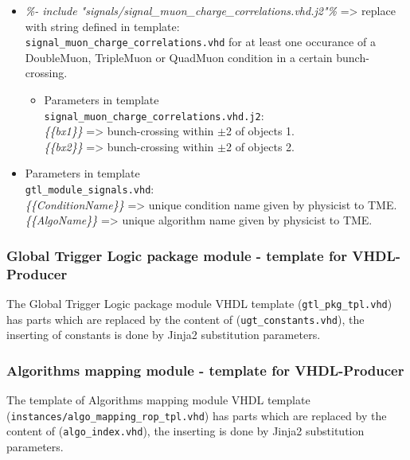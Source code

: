 \begin{itemize}
\item \textit{{\%- include "signals/signal\_muon\_charge\_correlations.vhd.j2"\%}} => replace with string defined in template:\\
\texttt{signal\_muon\_charge\_correlations.vhd} for at least one occurance of a DoubleMuon, TripleMuon or QuadMuon condition in a certain bunch-crossing.
    \begin{itemize}
    \item Parameters in template\\ \texttt{signal\_muon\_charge\_correlations.vhd.j2}:\\
    \textit{\{\{bx1\}\}} => bunch-crossing within $\pm$2 of objects 1.\\
    \textit{\{\{bx2\}\}} => bunch-crossing within $\pm$2 of objects 2.\\
    \end{itemize}
\end{itemize}
\begin{itemize}
    \item Parameters in template\\ \texttt{gtl\_module\_signals.vhd}:\\
    \textit{\{\{ConditionName\}\}} => unique condition name given by physicist to TME.\\
    \textit{\{\{AlgoName\}\}} => unique algorithm name given by physicist to TME.
\end{itemize}

\subsubsection{Global Trigger Logic package module - template for VHDL-Producer}
\label{sec:gtl:gtl_pkg_tme}
The Global Trigger Logic package module VHDL template (\texttt{gtl\_pkg\_tpl.vhd}) has parts which are replaced by the content of (\texttt{ugt\_constants.vhd}), the inserting of constants is done by Jinja2 substitution parameters.

\subsubsection{Algorithms mapping module - template for VHDL-Producer}
\label{sec:gtl:algo_mapping_tme}
The template of Algorithms mapping module VHDL template (\texttt{instances/algo\_mapping\_rop\_tpl.vhd}) has parts which are replaced by the content of (\texttt{algo\_index.vhd}), the inserting is done by Jinja2 substitution parameters.

